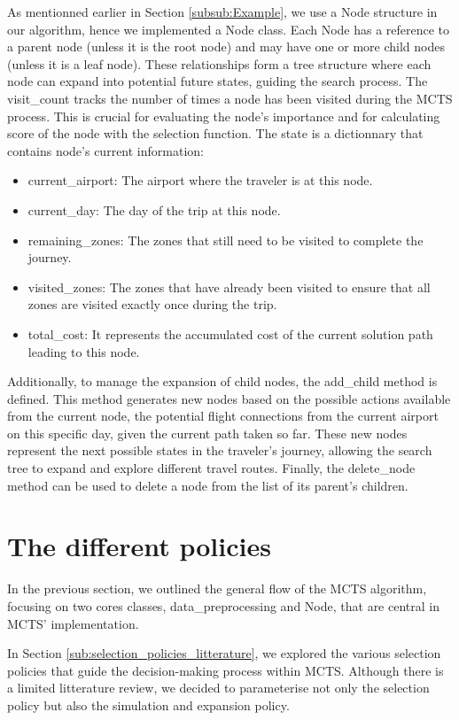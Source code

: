 As mentionned earlier in Section \ref{subsub:Example}, we use a Node structure in our algorithm, hence we implemented a Node class.
Each Node has a reference to a parent node (unless it is the root node) and may have one or more child nodes (unless it is a leaf node). These relationships form a tree structure where each node can expand into potential future states, guiding the search process.
The visit\_count tracks the number of times a node has been visited during the MCTS process. This is crucial for evaluating the node’s importance and for calculating score of the node with the selection function.
The state is a dictionnary that contains node's current information:
\begin{itemize}
    \item current\_airport: The airport where the traveler is  at this node.
    \item current\_day: The day of the trip at this node.
    \item remaining\_zones: The zones that still need to be visited to complete the journey.
    \item visited\_zones: The zones that have already been visited to ensure that all zones are visited exactly once during the trip.
    \item total\_cost: It represents the accumulated cost of the current solution path leading to this node.
\end{itemize}

Additionally, to manage the expansion of child nodes, the add\_child method is defined.
This method generates new nodes based on the possible actions available from the current node, the potential flight connections from the current airport on this specific day, given the current path taken so far. These new nodes represent the next possible states in the traveler’s journey, allowing the search tree to expand and explore different travel routes.
Finally, the delete\_node method can be used to delete a node from the list of its parent's children.


\section{The different policies}
In the previous section, we outlined the general flow of the MCTS algorithm, focusing on two cores classes, data\_preprocessing and Node, that are central in MCTS' implementation.

In Section \ref{sub:selection_policies_litterature}, we explored the various selection policies that guide the decision-making process within MCTS.
Although there is a limited litterature review, we decided to parameterise not only the selection policy but also the simulation and expansion policy.


